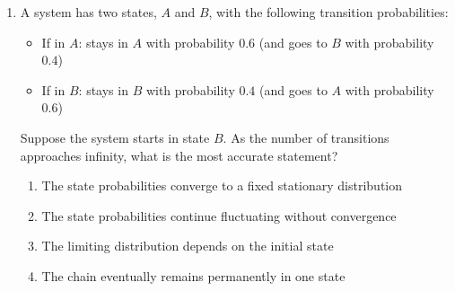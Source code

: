 \documentclass[12pt]{article}
\begin{document}
\begin{enumerate}[label=Q\arabic*.]
 \item A system has two states, $A$ and $B$, with the following transition probabilities:
 \begin{itemize}
     \item If in $A$: stays in $A$ with probability $0.6$ (and goes to $B$ with probability $0.4$)
     \item If in $B$: stays in $B$ with probability $0.4$ (and goes to $A$ with probability $0.6$)
 \end{itemize}
 Suppose the system starts in state $B$. As the number of transitions approaches infinity, what is the most accurate statement?
 \begin{enumerate}[label=(\Alph*)]
     \item The state probabilities converge to a fixed stationary distribution
     \item The state probabilities continue fluctuating without convergence
     \item The limiting distribution depends on the initial state
     \item The chain eventually remains permanently in one state
 \end{enumerate}
 

\end{enumerate}
\end{document}
